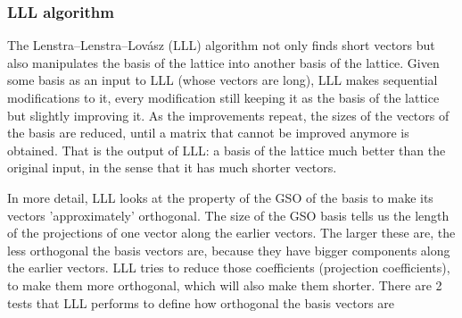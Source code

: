 \subsubsection{LLL algorithm}
\label{sec:LLLalgorithm}
The Lenstra–Lenstra–Lovász (LLL) algorithm not only finds short vectors but also
manipulates the basis of the lattice into another basis of the lattice. Given
some basis as an input to LLL (whose vectors are long), LLL makes sequential
modifications to it, every modification still keeping it as the basis of the
lattice but slightly improving it. As the improvements repeat, the sizes
of the vectors of the basis are reduced, until a matrix that
cannot be improved anymore is obtained. That is the output of LLL: a basis of the lattice
much better than the original input, in the sense that it has much
shorter vectors.

In more detail, LLL looks at the property of the GSO of the basis to make its vectors 'approximately' orthogonal. The size of the GSO basis tells us the
length of the projections of one vector along the earlier vectors. The larger
these are, the less orthogonal the basis vectors are, because they have bigger
components along the earlier vectors. LLL tries to reduce those coefficients
(projection coefficients), to make them more orthogonal, which will also make
them shorter. There are 2 tests that LLL performs to define how orthogonal the basis
vectors are

